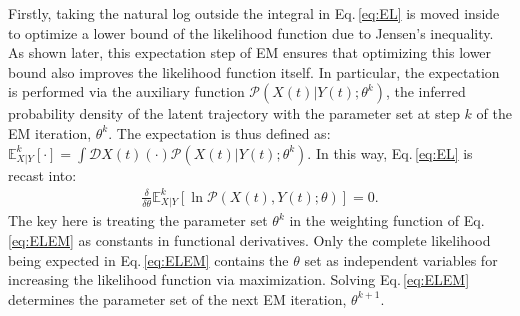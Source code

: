 \documentclass[journal=jpcbfk,manuscript=article,layout=twocolumn,articletitle=true]{achemso}
\begin{document}
Firstly, taking the natural log outside the integral in Eq.\,\ref{eq:EL} is moved inside to optimize a lower bound of the likelihood function due to Jensen's inequality. As shown later, this expectation step of EM ensures that optimizing this lower bound also improves the likelihood function itself. In particular, the expectation is performed via the auxiliary function $\mathcal{P}(X(t)|Y(t);\theta^k)$, the inferred probability density of the latent trajectory with the parameter set at step $k$ of the EM iteration, $\theta^k$.\cite{Little:2002vf} The expectation is thus defined as: $\mathbb{E}^k_{X|Y}[\cdot] = \int \mathcal{D} X(t) (\cdot) \mathcal{P}(X(t)|Y(t);\theta^k)$. In this way, Eq.\,\ref{eq:EL} is recast into:
\begin{align}
\label{eq:ELEM}
\frac{\delta }{\delta \theta}  \mathbb{E}^k_{X|Y} \left[    \ln \mathcal{P}(X(t),Y(t);\theta) \right]=0.
\end{align}
The key here is treating the parameter set $\theta^k$ in the weighting function of Eq.\,\ref{eq:ELEM} as constants in functional derivatives. Only the complete likelihood being expected in Eq.\,\ref{eq:ELEM} contains the $\theta$ set as independent variables for increasing the likelihood function via maximization. Solving Eq.\,\ref{eq:ELEM} determines the parameter set of the next EM iteration, $\theta^{k+1}$.
\end{document}
